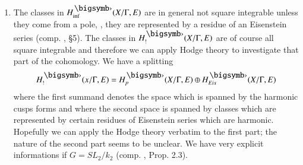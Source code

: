 \begin{cremarks*}
\begin{enumerate}[(1)]
\item The classes in $H^\bigdot_{\inf} (X/ \Gamma, E)$ are in general not square integrable unless they come from a pole, \ie, they are represented by a residue of an Eisenstein series (comp. \cite{art5-key11}, \S 5). The classes in $H^\bigdot_! (X/\Gamma , E)$ are of course all square integrable and therefore we can apply Hodge theory to investigate that part of the cohomology. We have a splitting
$$
H^\bigdot_! (x/ \Gamma, E) = H^\bigdot_p (X/ \Gamma , E) \oplus H^\bigdot_{Eis} (X/ \Gamma, E)
$$
where the first summand denotes the space which is spanned by the harmonic cusps forms and where the second space is spanned by classes which are represented by certain residues of Eisenstein series which are harmonic. Hopefully we can apply the Hodge theory verbatim to the first part; the nature of the second part seems to be unclear. We have very explicit informations if $G = SL_2 / k_2$ (comp. \cite{art5-key7}, Prop. 2.3).
\end{enumerate}
\end{cremarks*}

